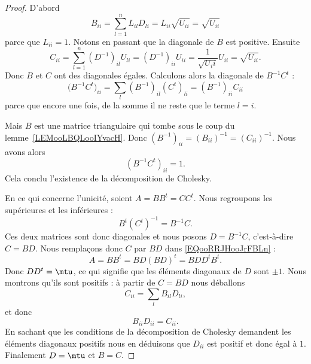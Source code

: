 \begin{proof}
	D'abord
	\begin{equation}
		B_{ii}=\sum_{l=1}^nL_{il}D_{li}=L_{ii}\sqrt{ U_{ii} }=\sqrt{ U_{ii} }
	\end{equation}
	parce que \( L_{ii}=1\). Notons en passant que la diagonale de \( B\) est positive.  Ensuite
	\begin{equation}
		C_{ii}=\sum_{l=1}^n(D^{-1})_{il}U_{li}=(D^{-1})_{ii}U_{ii}=\frac{1}{ \sqrt{ U_ii } }U_{ii}=\sqrt{ U_{ii} }.
	\end{equation}
	Donc \( B\) et $C$ ont des diagonales égales. Calculons alors la diagonale de \( B^{-1}C^t\) :
	\begin{equation}
		\big( B^{-1}C^t \big)_{ii}=\sum_l(B^{-1})_{il}(C^t)_{li}=(B^{-1})_{ii}C_{ii}
	\end{equation}
	parce que encore une fois, de la somme il ne reste que le terme \( l=i\).

	Mais \( B\) est une matrice triangulaire qui tombe sous le coup du lemme~\ref{LEMooLBQLooIYvacH}. Donc \( (B^{-1})_{ii}=(B_{ii})^{-1}=(C_{ii})^{-1}\). Nous avons alors
	\begin{equation}
		(B^{-1}C^t)_{ii}=1.
	\end{equation}
	Cela conclu l'existence de la décomposition de Cholesky.

	En ce qui concerne l'unicité, soient \( A=BB^t=CC^t\). Nous regroupons les supérieures et les inférieures :
	\begin{equation}        \label{EQooRRJHooJrFBLn}
		B^t(C^t)^{-1}=B^{-1}C.
	\end{equation}
	Ces deux matrices sont donc diagonales et nous posons \( D=B^{-1} C\), c'est-à-dire \( C=BD\). Nous remplaçons donc \( C\) par \( BD\) dans \eqref{EQooRRJHooJrFBLn} :
	\begin{equation}
		A=BB^t=BD(BD)^t=BDD^tB^t.
	\end{equation}
	Donc \( DD^t=\mtu\), ce qui signifie que les éléments diagonaux de \( D\) sont \( \pm 1\). Nous montrons qu'ils sont positifs : à partir de \( C=BD\) nous déballons
	\begin{equation}
		C_{ii}=\sum_lB_{il}D_{li},
	\end{equation}
	et donc
	\begin{equation}
		B_{ii}D_{ii}=C_{ii}.
	\end{equation}
	En sachant que les conditions de la décomposition de Cholesky demandent les éléments diagonaux positifs nous en déduisons que \( D_{ii}\) est positif et donc égal à \( 1\). Finalement \( D=\mtu\) et \( B=C\).
\end{proof}

